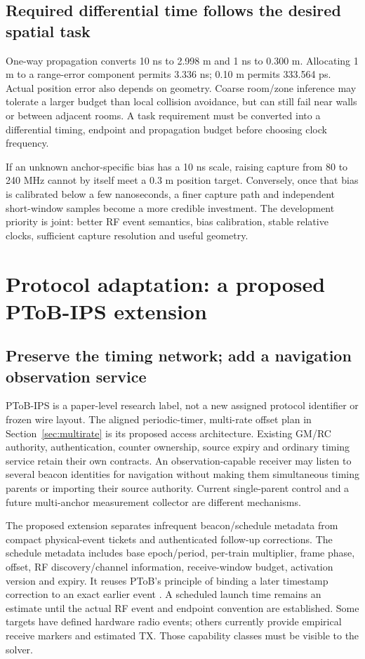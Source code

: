 \documentclass[11pt,letterpaper]{article}
\begin{document}
\subsection{Required differential time follows the desired spatial task}
One-way propagation converts 10 ns to 2.998 m and 1 ns to 0.300 m. Allocating 1 m to a range-error component permits 3.336 ns; 0.10 m permits 333.564 ps. Actual position error also depends on geometry. Coarse room/zone inference may tolerate a larger budget than local collision avoidance, but can still fail near walls or between adjacent rooms. A task requirement must be converted into a differential timing, endpoint and propagation budget before choosing clock frequency.

If an unknown anchor-specific bias has a 10 ns scale, raising capture from 80 to 240 MHz cannot by itself meet a 0.3 m position target. Conversely, once that bias is calibrated below a few nanoseconds, a finer capture path and independent short-window samples become a more credible investment. The development priority is joint: better RF event semantics, bias calibration, stable relative clocks, sufficient capture resolution and useful geometry.

\section{Protocol adaptation: a proposed PToB-IPS extension}\label{sec:protocol}
\subsection{Preserve the timing network; add a navigation observation service}
PToB-IPS is a paper-level research label, not a new assigned protocol identifier or frozen wire layout. The aligned periodic-timer, multi-rate offset plan in Section~\ref{sec:multirate} is its proposed access architecture. Existing GM/RC authority, authentication, counter ownership, source expiry and ordinary timing service retain their own contracts. An observation-capable receiver may listen to several beacon identities for navigation without making them simultaneous timing parents or importing their source authority. Current single-parent control and a future multi-anchor measurement collector are different mechanisms.

The proposed extension separates infrequent beacon/schedule metadata from compact physical-event tickets and authenticated follow-up corrections. The schedule metadata includes base epoch/period, per-train multiplier, frame phase, offset, RF discovery/channel information, receive-window budget, activation version and expiry. It reuses PToB's principle of binding a later timestamp correction to an exact earlier event \cite{v14paper}. A scheduled launch time remains an estimate until the actual RF event and endpoint convention are established. Some targets have defined hardware radio events; others currently provide empirical receive markers and estimated TX. Those capability classes must be visible to the solver.
\end{document}
